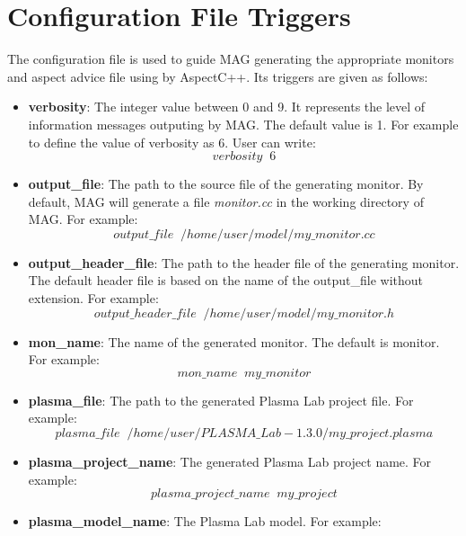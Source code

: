 \documentclass{llncs}
\begin{document}
\section{Configuration File Triggers}
\label{sec:configuration_file}
The configuration file is used to guide MAG generating the appropriate monitors and aspect advice file using by AspectC++. Its triggers are given as follows:
\begin{itemize}
\item \textbf{verbosity}: The integer value between 0 and 9. It represents the level of information messages outputing by MAG. The default value is 1. For example to define the value of verbosity as 6. User can write:
\begin{displaymath}
verbosity \; \; 6
\end{displaymath}
\item \textbf{output\_file}: The path to the source file of the generating monitor. By default, MAG will generate a file \textit{monitor.cc} in the working directory of MAG. For example:
\begin{displaymath}
output\_file \; \; /home/user/model/my\_monitor.cc
\end{displaymath}
\item \textbf{output\_header\_file}: The path to the header file of the generating monitor. The default header file is based on the name of the output\_file without extension. For example:
\begin{displaymath}
output\_header\_file \; \; /home/user/model/my\_monitor.h
\end{displaymath}
\item \textbf{mon\_name}: The name of the generated monitor. The default is monitor. For example:
\begin{displaymath}
mon\_name \; \; my\_monitor
\end{displaymath}
\item \textbf{plasma\_file}: The path to the generated Plasma Lab project file. For example:
\begin{displaymath}
plasma\_file \; \; /home/user/PLASMA\_Lab-1.3.0/my\_project.plasma
\end{displaymath}
\item \textbf{plasma\_project\_name}: The generated Plasma Lab project name. For example:
\begin{displaymath}
plasma\_project\_name \; \; my\_project
\end{displaymath}
\item \textbf{plasma\_model\_name}: The Plasma Lab model. For example:

\end{itemize}
\end{document}
